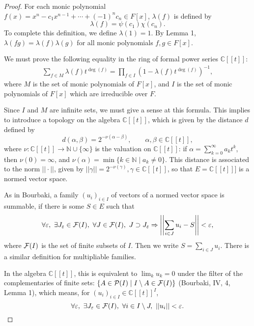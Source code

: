 \documentclass[11pt,a4paper]{article}
\newcommand{\N}{\mathbb{N}}
\newcommand{\C}{\mathbb{C}}
\begin{document}
\begin{proof}

For each monic polynomial $f(x) = x^n - c_1x^{n-1} + \cdots + (-1)^n c_n \in F[x]$, $\lambda(f)$ is defined by
$$\lambda(f) = \psi(c_1) \chi(c_n).$$
To complete this definition, we define $\lambda(1) = 1$. By Lemma 1, $\lambda(fg) = \lambda(f) \lambda(g)$ for all monic polynomials $f,g \in F[x]$.

We must prove the following equality in the ring of formal power series $\C[[t]]$:
\begin{align}
\sum_{f \in M} \lambda(f) t^{\deg(f)} = \prod_{f \in I} \left(1 - \lambda(f) t^{\deg(f)}\right)^{-1},
\end{align}
where $M$ is the set of monic polynomials of $F[x]$, and $I$ is the set of monic polynomials of  $F[x]$ which are irreducible over $F$. 

Since $I$ and $M$ are infinite sets, we must give a sense at this formula. This implies to introduce a topology on the algebra $\C[[t]]$, which is given by the distance $d$ defined by
$$d(\alpha, \beta) = 2^{-\nu(\alpha - \beta)}, \qquad \alpha, \beta \in \C[[t]],$$
where $\nu : \C[[t]] \to \N \cup \{\infty\}$ is the valuation on $\C[[t]]$: if $\alpha = \sum_{k=0}^\infty a_k t^k$, then $\nu(0) = \infty$, and $\nu(\alpha) = \min \{k \in \N \mid a_k \ne 0\}$.
This distance is associated to the norm $|| \cdot ||$, given by $||\gamma|| = 2^{-\nu(\gamma)}, \gamma \in \C[[t]]$, so that $E = \C[[t]]]$ is a normed vector space. %


As in Bourbaki, a family $(u_i)_{i \in I}$ of vectors of a normed vector space is summable, if there is some $S \in E$ such that
$$\forall \varepsilon,\ \exists J_\varepsilon \in {\cal F}(I), \ \forall J \in {\cal F}(I),\  J \supset J_\varepsilon \Rightarrow \left |\left | \sum_{i \in J} u_i - S \right |\right | < \varepsilon,$$
 where ${\cal F}(I)$ is the set of finite subsets of $I$. Then we write $S = \sum\limits_{i \in J} u_i$. There is a similar definition for multipliable families.
 
In the algebra $\C[[t]]$, this is equivalent to $\lim_k u_k = 0$ under the filter of the complementaries of finite sets: ${\{A \in {\cal P}(I) \mid I \setminus A \in {\cal F}(I)\}}$ (Bourbaki, IV, 4, Lemma 1), which means, for $(u_i)_{i\in I} \in \C[[t]]^I$,
$$\forall \varepsilon,\ \exists J_\varepsilon \in {\cal F}(I), \ \forall i \in I \setminus J,\  \left |\left | u_i \right |\right | < \varepsilon.$$


\end{proof}
\end{document}

